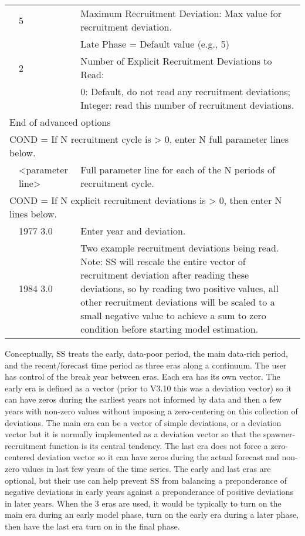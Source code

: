 \begin{longtable}{p{1cm} p{3cm} p{11cm}}
	\Tstrut & 5    & Maximum Recruitment Deviation: Max value for recruitment deviation. \\
			&      & Late Phase = Default value (e.g., 5)\\
	
	\Tstrut & 2    & Number of Explicit Recruitment Deviations to Read:\\
			&      & 0: Default, do not read any recruitment deviations; Integer: read this number of recruitment deviations.\\
	
	\multicolumn{3}{l}{End of advanced options}\Tstrut\Bstrut\\
	\hline

	\multicolumn{3}{l}{COND = If N recruitment cycle is > 0, enter N full parameter lines below.}\Tstrut\\
	\Tstrut & <parameter line> & Full parameter line for each of the N periods of recruitment cycle.\Bstrut\\
	\hline

	\multicolumn{3}{l}{COND = If N explicit recruitment deviations is > 0, then enter N lines below.}\Tstrut\Bstrut\\
	& 1977 3.0 & Enter year and deviation.\\
	& 1984 3.0 & Two example recruitment deviations being read.  Note: SS will rescale the entire vector of recruitment deviation after reading these deviations, so by reading two positive values, all other recruitment deviations will be scaled to a small negative value to achieve a sum to zero condition before starting model estimation.\Bstrut\\
	\hline
\end{longtable}

Conceptually, SS treats the early, data-poor period, the main data-rich period, and the recent/forecast time period as three eras along a continuum. The user has control of the break year between eras.  Each era has its own vector. The early era is defined as a vector (prior to V3.10 this was a deviation vector) so it can have zeros during the earliest years not informed by data and then a few years with non-zero values without imposing a zero-centering on this collection of deviations. The main era can be a vector of simple deviations, or a deviation vector but it is normally implemented as a deviation vector so that the spawner-recruitment function is its central tendency. The last era does not force a zero-centered deviation vector so it can have zeros during the actual forecast and non-zero values in last few years of the time series. The early and last eras are optional, but their use can help prevent SS from balancing a preponderance of negative deviations in early years against a preponderance of positive deviations in later years. When the 3 eras are used, it would be typically to turn on the main era during an early model phase, turn on the early era during a later phase, then have the last era turn on in the final phase.

